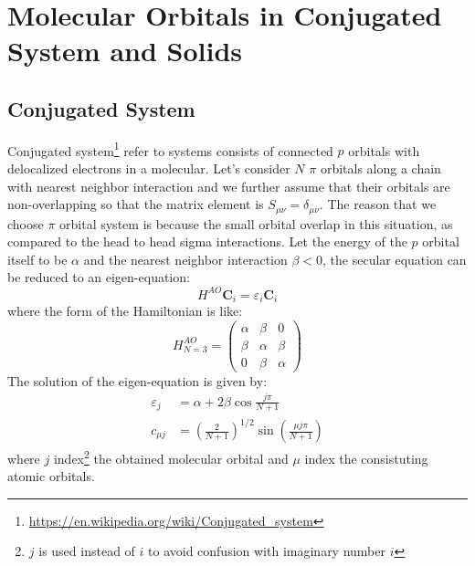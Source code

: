 \documentclass{article}
\begin{document}
\section{Molecular Orbitals in Conjugated System and Solids}
\subsection{Conjugated System}
Conjugated system\footnote{\url{https://en.wikipedia.org/wiki/Conjugated_system}} 
refer to systems consists of connected $p$ orbitals with delocalized electrons in a molecular. 
Let's consider $N$ $\pi$ orbitals along a chain with nearest neighbor interaction and 
we further assume that their orbitals are non-overlapping so that the matrix 
element is $S_{\mu\nu} = \delta_{\mu\nu}$. 
The reason that we choose $\pi$ orbital system is because the small orbital overlap in this 
situation, as compared to the head to head sigma interactions. 
Let the energy of the $p$ orbital itself to be $\alpha$
and the nearest neighbor interaction $\beta < 0$, the secular equation can be reduced to 
an eigen-equation:
\begin{equation}
    H^{AO} \mathbf{C}_i = \varepsilon_i \mathbf{C}_i
\end{equation}
where the form of the Hamiltonian is like:
\begin{equation}
    H^{AO}_{N=3} = \left(\begin{matrix}
        \alpha & \beta & 0 \\ 
        \beta & \alpha & \beta \\ 
        0 & \beta & \alpha 
    \end{matrix}\right)
\end{equation}
The solution of the eigen-equation is given by:
\begin{align}
    \varepsilon_j &= \alpha + 2 \beta \cos\frac{j\pi}{N+1} \\ 
    c_{\mu j} &= \left(\frac{2}{N+1}\right)^{1/2} \sin\left(\frac{\mu j\pi}{N+1}\right) 
\end{align}
where $j$ index\footnote{$j$ is used instead of $i$ to avoid confusion with imaginary number $i$} 
the obtained molecular orbital and $\mu$ index the consistuting atomic orbitals. 
\end{document}
